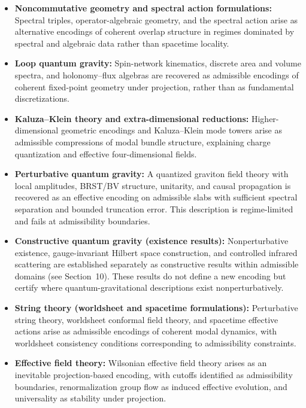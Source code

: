 \documentclass[11pt]{article}
\begin{document}
\begin{itemize}
\item \textbf{Noncommutative geometry and spectral action formulations:}
Spectral triples, operator-algebraic geometry, and the spectral action arise as alternative
encodings of coherent overlap structure in regimes dominated by spectral and algebraic
data rather than spacetime locality.

\item \textbf{Loop quantum gravity:}
Spin-network kinematics, discrete area and volume spectra, and holonomy--flux algebras
are recovered as admissible encodings of coherent fixed-point geometry under projection,
rather than as fundamental discretizations.

\item \textbf{Kaluza--Klein theory and extra-dimensional reductions:}
Higher-dimensional geometric encodings and Kaluza--Klein mode towers arise as admissible
compressions of modal bundle structure, explaining charge quantization and effective
four-dimensional fields.

\item \textbf{Perturbative quantum gravity:}
A quantized graviton field theory with local amplitudes,
BRST/BV structure, unitarity, and causal propagation is recovered as an effective encoding
on admissible slabs with sufficient spectral separation and bounded truncation error. This
description is regime-limited and fails at admissibility boundaries.

\item \textbf{Constructive quantum gravity (existence results):}
Nonperturbative existence, gauge-invariant
Hilbert space construction, and controlled infrared scattering are established separately as
constructive results within admissible domains (see Section~10). These results do not define
a new encoding but certify where quantum-gravitational descriptions exist nonperturbatively.

\item \textbf{String theory (worldsheet and spacetime formulations):}
Perturbative string theory, worldsheet conformal field theory, and spacetime effective
actions arise as admissible encodings of coherent modal dynamics, with worldsheet
consistency conditions corresponding to admissibility constraints.

\item \textbf{Effective field theory:}
Wilsonian effective field theory arises as an inevitable projection-based encoding, with
cutoffs identified as admissibility boundaries, renormalization group flow as induced
effective evolution, and universality as stability under projection.


\end{itemize}
\end{document}
